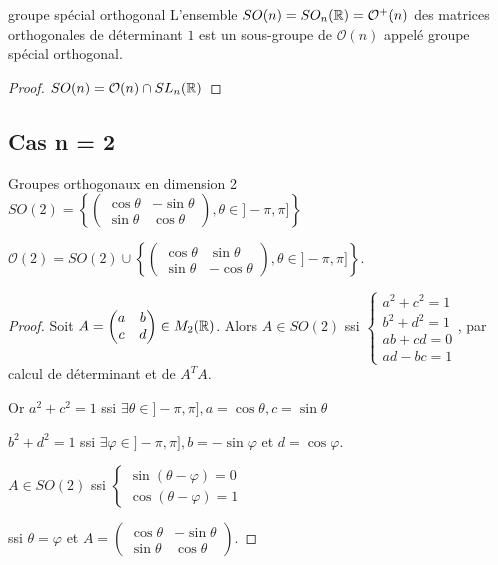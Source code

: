 \begin{theoreme}{groupe spécial orthogonal}{}
    L'ensemble $SO(n) = SO_n(\mathbb{R}) = \mathcal O^+(n)$ des matrices orthogonales de déterminant $1$ est un 
    sous-groupe de $\mathcal O(n)$ appelé groupe spécial orthogonal. 
\end{theoreme}

\begin{proof}
    $SO(n) = \mathcal O(n) \cap SL_n(\mathbb{R})$
\end{proof}

\subsection{Cas n = 2}

\begin{theoreme}{Groupes orthogonaux en dimension 2}{}
    $SO(2) = \left\{ \begin{pmatrix}
        \cos \theta & -\sin \theta \\
        \sin \theta & \cos \theta
        \end{pmatrix}, \theta \in ]- \pi, \pi] \right\}$
        
        $\mathcal O(2) = SO(2) \cup \left\{ \begin{pmatrix}
        \cos \theta & \sin \theta \\
        \sin \theta & -\cos \theta
        \end{pmatrix}, \theta \in ]- \pi, \pi] \right\}$.
\end{theoreme}

\begin{proof}
    Soit $A = \begin{pmatrix}
        a & b \\
        c & d
    \end{pmatrix} \in M_2(\mathbb{R})$. Alors $A \in SO(2)$ ssi 
    $\begin{cases}
        a^2 + c^2 = 1 \\
        b^2 + d^2 = 1 \\
        ab + cd = 0 \\
        ad - bc = 1
    \end{cases}$, par calcul de déterminant et de $A^T A$.

    Or $a^2 + c^2 = 1$ ssi $\exists \theta \in ]- \pi, \pi], a = \cos \theta, c = \sin \theta$ 

    $b^2 + d^2 = 1$ ssi $\exists \varphi \in ]- \pi, \pi], b = - \sin \varphi$ et $d = \cos \varphi$.

    $A \in SO(2)$ ssi 
    $\begin{cases}
        \sin (\theta - \varphi) = 0 \\
        \cos (\theta - \varphi) = 1
    \end{cases}$

    ssi $\theta = \varphi$ et $A = \begin{pmatrix}
        \cos \theta & -\sin \theta \\
        \sin \theta & \cos \theta
    \end{pmatrix}$.
\end{proof}


